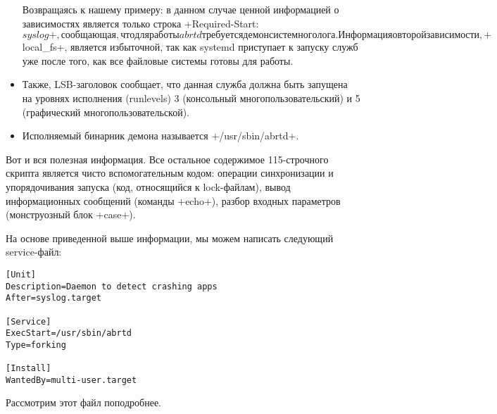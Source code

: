\documentclass[10pt,oneside,a4paper]{article}
\begin{document}
\begin{itemize}
		Возвращаясь к нашему примеру: в данном случае ценной
		информацией о зависимостях является только строка
		+Required-Start: $syslog+, сообщающая, что для работы
		abrtd требуется демон системного лога.  Информация о второй
		зависимости, +$local_fs+, является избыточной, так как
		systemd приступает к запуску служб уже после того, как все
		файловые системы готовы для работы. 
	\item Также, LSB-заголовок сообщает, что данная служба должна быть
		запущена на уровнях исполнения (runlevels) 3 (консольный
		многопользовательский) и 5 (графический
		многопользовательской).
	\item Исполняемый бинарник демона называется +/usr/sbin/abrtd+. 
\end{itemize}

Вот и вся полезная информация. Все остальное содержимое 115-строчного скрипта
является чисто вспомогательным кодом: операции синхронизации и упорядочивания
запуска (код, относящийся к lock-файлам), вывод информационных сообщений
(команды +echo+), разбор входных параметров (монструозный блок
+case+).

На основе приведенной выше информации, мы можем написать следующий
service-файл: 
\begin{Verbatim}
[Unit]
Description=Daemon to detect crashing apps
After=syslog.target

[Service]
ExecStart=/usr/sbin/abrtd
Type=forking

[Install]
WantedBy=multi-user.target
\end{Verbatim}

Рассмотрим этот файл поподробнее.
\end{document}
